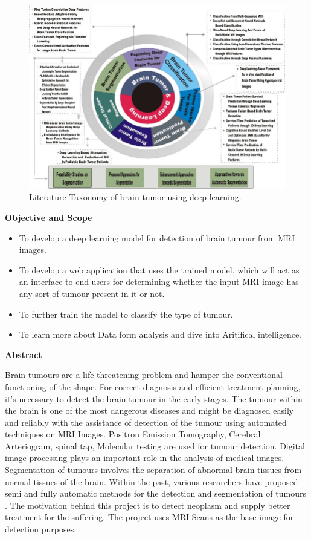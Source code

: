 \begin{landscape}
\begin{figure}[H]
  \includegraphics[scale=0.75]{taxonomy_brain.jpg}
  \caption{Literature Taxonomy of brain tumor using deep learning.} \label{fig:ishan}
\end{figure}
\end{landscape}
{\bf \Large Objective and Scope}
\begin{itemize}
    \item To develop a deep learning model for detection of brain tumour from MRI images.
    \item To develop a web application that uses the trained model, which will act as an interface to end users for determining whether the input MRI image has any sort of tumour present in it or not.
    \item To further train the model to classify the type of tumour.
    \item To learn more about Data form analysis and dive into Aritifical intelligence.
\end{itemize}
{\bf \Large Abstract}\par
Brain tumours are a life-threatening problem and hamper the conventional functioning of the shape. For correct diagnosis and efficient treatment planning, it's necessary to detect the brain tumour in the early stages. The tumour within the brain is one of the most dangerous diseases and might be diagnosed easily and reliably with the assistance of detection of the tumour using automated techniques on MRI Images. Positron Emission Tomography, Cerebral Arteriogram, spinal tap, Molecular testing are used for tumour detection. Digital image processing plays an important role in the analysis of medical images. Segmentation of tumours involves the separation of abnormal brain tissues from normal tissues of the brain. Within the past, various researchers have proposed semi and fully automatic methods for the detection and segmentation of tumours . The motivation behind this project is to detect neoplasm and supply better treatment for the suffering. The project uses MRI Scans as the base image for detection purposes.\\
